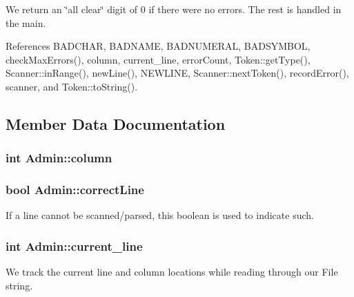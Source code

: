 We return an \char`\"{}all clear\char`\"{} digit of 0 if there were no errors. The rest is handled in the main. 



References BADCHAR, BADNAME, BADNUMERAL, BADSYMBOL, checkMaxErrors(), column, current\_\-line, errorCount, Token::getType(), Scanner::inRange(), newLine(), NEWLINE, Scanner::nextToken(), recordError(), scanner, and Token::toString().



\subsection{Member Data Documentation}
\hypertarget{classAdmin_ae6bcb0d3aa08b938197a332c5af5a456}{
\subsubsection[{column}]{\setlength{\rightskip}{0pt plus 5cm}int {\bf Admin::column}}}
\label{classAdmin_ae6bcb0d3aa08b938197a332c5af5a456}
\hypertarget{classAdmin_a18dd34f91c28721e9ba9ec9370ae5f98}{
\subsubsection[{correctLine}]{\setlength{\rightskip}{0pt plus 5cm}bool {\bf Admin::correctLine}}}
\label{classAdmin_a18dd34f91c28721e9ba9ec9370ae5f98}


If a line cannot be scanned/parsed, this boolean is used to indicate such. 

\hypertarget{classAdmin_a77039c04350669e25d604593a77bea36}{
\subsubsection[{current\_\-line}]{\setlength{\rightskip}{0pt plus 5cm}int {\bf Admin::current\_\-line}}}
\label{classAdmin_a77039c04350669e25d604593a77bea36}


We track the current line and column locations while reading through our File string. 

